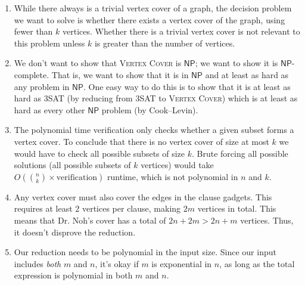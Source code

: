 \documentclass[12 pt, letterpaper]{hmcpset}
\begin{document}
\begin{solution}
	\begin{enumerate}
		\item While there always is a trivial vertex cover of a graph, the decision problem we want to solve is whether there exists a vertex cover of the graph, using fewer than $k$ vertices. Whether there is a trivial vertex cover is not relevant to this problem unless $k$ is greater than the number of vertices.

		\item We don't want to show that \textsc{Vertex Cover} is $\mathsf{NP}$; we want to show it is $\mathsf{NP}$-complete. That is, we want to show that it is in $\mathsf{NP}$ and at least as hard as any problem in $\mathsf{NP}$. One easy way to do this is to show that it is at least as hard as \textsc{3SAT} (by reducing from \textsc{3SAT} to \textsc{Vertex Cover}) which is at least as hard as every other $\mathsf{NP}$ problem (by Cook--Levin).

		\item The polynomial time verification only checks whether a given subset forms a vertex cover. To conclude that there is no vertex cover of size at most $k$ we would have to check all possible subsets of size $k$. Brute forcing all possible solutions (all possible subsets of $k$ vertices) would take $O(\binom{n}{k} \times \text{verification})$ runtime, which is not polynomial in $n$ and $k$.

		\item Any vertex cover must also cover the edges in the clause gadgets. This requires at least $2$ vertices per clause, making $2m$ vertices in total. This means that Dr. Noh's cover has a total of $2n + 2m > 2n + m$ vertices. Thus, it doesn't disprove the reduction.

		\item Our reduction needs to be polynomial in the input size. Since our input includes \emph{both} $m$ and $n$, it's okay if $m$ is exponential in $n$, as long as the total expression is polynomial in both $m$ and $n$.
	\end{enumerate}
\end{solution}

\pagebreak
\end{document}
